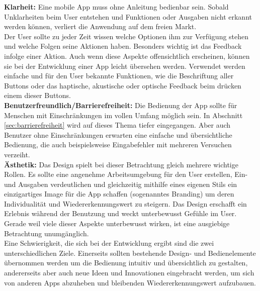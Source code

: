 \noindent
{}
\textbf{Klarheit:} Eine mobile App muss ohne Anleitung bedienbar sein. Sobald Unklarheiten beim User entstehen und Funktionen oder Ausgaben nicht erkannt werden können, verliert die Anwendung auf dem freien Markt. \\
Der User sollte zu jeder Zeit wissen welche Optionen ihm zur Verfügung stehen und welche Folgen seine Aktionen haben. Besonders wichtig ist das Feedback infolge einer Aktion. Auch wenn diese Aspekte offensichtlich erscheinen, können sie bei der Entwicklung einer App leicht übersehen werden. Verwendet werden einfache und für den User bekannte Funktionen, wie die Beschriftung aller Buttons oder das haptische, akustische oder optische Feedback beim drücken einem dieser Buttons.\\

\noindent
{}
\textbf{Benutzerfreundlich/Barrierefreiheit:} Die Bedienung der App sollte für Menschen mit Einschränkungen im vollen Umfang möglich sein. In Abschnitt \ref{sec:barrierefreiheit} wird auf dieses Thema tiefer eingegangen. Aber auch Benutzer ohne Einschränkungen erwarten eine einfache und übersichtliche Bedienung, die auch beispielsweise  Eingabefehler mit mehreren Versuchen verzeiht.\\

\noindent
{}
\textbf{Ästhetik:} Das Design spielt bei dieser Betrachtung gleich mehrere wichtige Rollen. Es sollte eine angenehme Arbeitsumgebung für den User erstellen, Ein- und Ausgaben verdeutlichen und gleichzeitig mithilfe eines eigenen Stils ein einzigartiges Image für die App schaffen (sogenanntes Branding) um deren Individualität und Wiedererkennungswert zu steigern. Das Design erschafft ein Erlebnis während der Benutzung und weckt unterbewusst Gefühle im User. \\

\noindent
Gerade weil viele dieser Aspekte unterbewusst wirken, ist eine ausgiebige Betrachtung unumgänglich.\\
Eine Schwierigkeit, die sich bei der Entwicklung ergibt sind die zwei unterschiedlichen Ziele. Einerseits sollten bestehende Design- und Bedienelemente  übernommen werden um die Bedienung intuitiv und übersichtlich zu gestalten, andererseits aber auch neue Ideen und Innovationen eingebracht werden, um sich von anderen Apps abzuheben und bleibenden Wiedererkennungswert aufzubauen.
